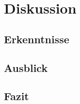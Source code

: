 \documentclass[ngerman]{report}
\begin{document}
    \chapter{Diskussion}  %
    \section{Erkenntnisse}
    
    \section{Ausblick}
    
    \section{Fazit}
    

    \printbibliography
\end{document}
